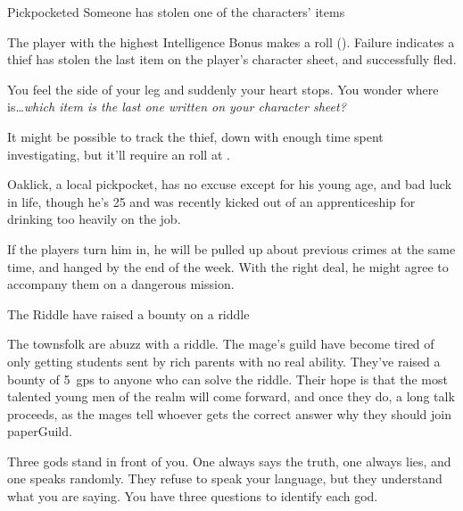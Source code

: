 \label{randommeetings}

{Pickpocketed}%
{Someone has stolen one of the characters' items}%

The player with the highest Intelligence Bonus makes a  roll (\tn[9]).
Failure indicates a thief has stolen the last item on the player's character sheet, and successfully fled.

\begin{boxtext}

  You feel the side of your leg and suddenly your heart stops.
  You wonder where is\ldots \textit{which item is the last one written on your character sheet?}

\end{boxtext}

It might be possible to track the thief, down with enough time spent investigating, but it'll require an  roll at \tn[11].

Oaklick, a local pickpocket, has no excuse except for his young age, and bad luck in life, though he's 25 and was recently kicked out of an apprenticeship for drinking too heavily on the job.

If the players turn him in, he will be pulled up about previous crimes at the same time, and hanged by the end of the week.
With the right deal, he might agree to accompany them on a dangerous mission.


{The Riddle}%
{ have raised a bounty on a riddle}%

The townsfolk are abuzz with a riddle.
The mage's guild have become tired of only getting students sent by rich parents with no real ability.
They've raised a bounty of 5~\glspl{gp} to anyone who can solve the riddle.
Their hope is that the most talented young men of the realm will come forward, and once they do, a long talk proceeds, as the mages tell whoever gets the correct answer why they should join \gls{paperGuild}.

\begin{speechtext}
  Three gods stand in front of you.
  One always says the truth, one always lies, and one speaks randomly.
  They refuse to speak your language, but they understand what you are saying.
  You have three questions to identify each god.
\end{speechtext}

